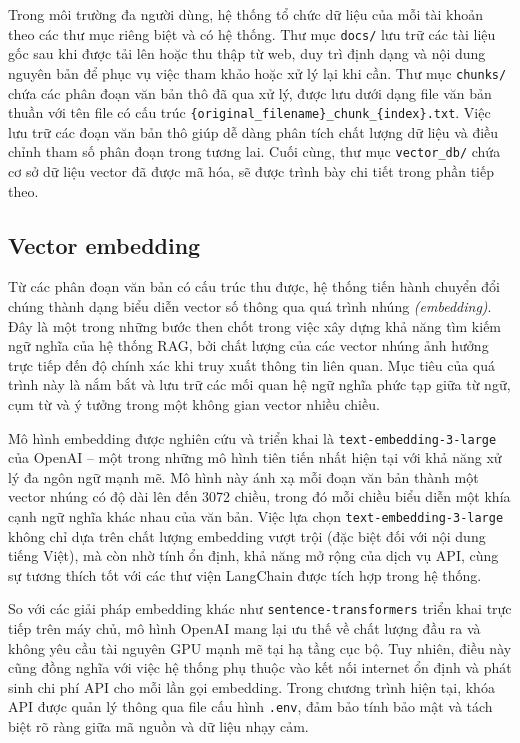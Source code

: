 Trong môi trường đa người dùng, hệ thống tổ chức dữ liệu của mỗi tài khoản theo các thư mục riêng biệt và có hệ thống. Thư mục \texttt{docs/} lưu trữ các tài liệu gốc sau khi được tải lên hoặc thu thập từ web, duy trì định dạng và nội dung nguyên bản để phục vụ việc tham khảo hoặc xử lý lại khi cần. Thư mục \texttt{chunks/} chứa các phân đoạn văn bản thô đã qua xử lý, được lưu dưới dạng file văn bản thuần với tên file có cấu trúc \texttt{\{original\_filename\}\_chunk\_\{index\}.txt}. Việc lưu trữ các đoạn văn bản thô giúp dễ dàng phân tích chất lượng dữ liệu và điều chỉnh tham số phân đoạn trong tương lai. Cuối cùng, thư mục \texttt{vector\_db/} chứa cơ sở dữ liệu vector đã được mã hóa, sẽ được trình bày chi tiết trong phần tiếp theo.

\subsection{Vector embedding}

Từ các phân đoạn văn bản có cấu trúc thu được, hệ thống tiến hành chuyển đổi chúng thành dạng biểu diễn vector số thông qua quá trình nhúng \emph{(embedding)}. Đây là một trong những bước then chốt trong việc xây dựng khả năng tìm kiếm ngữ nghĩa của hệ thống RAG, bởi chất lượng của các vector nhúng ảnh hưởng trực tiếp đến độ chính xác khi truy xuất thông tin liên quan. Mục tiêu của quá trình này là nắm bắt và lưu trữ các mối quan hệ ngữ nghĩa phức tạp giữa từ ngữ, cụm từ và ý tưởng trong một không gian vector nhiều chiều.

Mô hình embedding được nghiên cứu và triển khai là \texttt{text-embedding-3-large} của OpenAI -- một trong những mô hình tiên tiến nhất hiện tại với khả năng xử lý đa ngôn ngữ mạnh mẽ. Mô hình này ánh xạ mỗi đoạn văn bản thành một vector nhúng có độ dài lên đến 3072 chiều, trong đó mỗi chiều biểu diễn một khía cạnh ngữ nghĩa khác nhau của văn bản. Việc lựa chọn \texttt{text-embedding-3-large} không chỉ dựa trên chất lượng embedding vượt trội (đặc biệt đối với nội dung tiếng Việt), mà còn nhờ tính ổn định, khả năng mở rộng của dịch vụ API, cùng sự tương thích tốt với các thư viện LangChain được tích hợp trong hệ thống.

So với các giải pháp embedding khác như \texttt{sentence-transformers} triển khai trực tiếp trên máy chủ, mô hình OpenAI mang lại ưu thế về chất lượng đầu ra và không yêu cầu tài nguyên GPU mạnh mẽ tại hạ tầng cục bộ. Tuy nhiên, điều này cũng đồng nghĩa với việc hệ thống phụ thuộc vào kết nối internet ổn định và phát sinh chi phí API cho mỗi lần gọi embedding. Trong chương trình hiện tại, khóa API được quản lý thông qua file cấu hình \texttt{.env}, đảm bảo tính bảo mật và tách biệt rõ ràng giữa mã nguồn và dữ liệu nhạy cảm.

